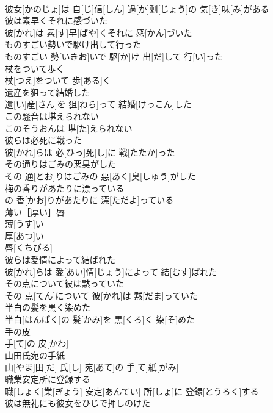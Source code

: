 \documentclass[8pt]{extreport}
\begin{document}
\begin{CJK}{UTF8}{min}
\\	彼女[かのじょ]は 自[じ]信[しん] 過[か]剰[じょう]の 気[き]味[み]がある
\\	彼は素早くそれに感づいた	
\\	彼[かれ]は 素[す]早[ばや]くそれに 感[かん]づいた
\\	ものすごい勢いで駆け出して行った	
\\	ものすごい 勢[いきお]いで 駆[か]け 出[だ]して 行[い]った
\\	杖をついて歩く	
\\	杖[つえ]をついて 歩[ある]く
\\	遺産を狙って結婚した	
\\	遺[い]産[さん]を 狙[ねら]って 結婚[けっこん]した
\\	この騒音は堪えられない	
\\	このそうおんは 堪[た]えられない
\\	彼らは必死に戦った	
\\	彼[かれ]らは 必[ひっ]死[し]に 戦[たたか]った
\\	その通りはごみの悪臭がした	
\\	その 通[とお]りはごみの 悪[あく]臭[しゅう]がした
\\	梅の香りがあたりに漂っている	
\\	[｟文語｠
\\	梅[うめ]の 香[かお]りがあたりに 漂[ただよ]っている
\\	薄い［厚い］唇	
\\	薄[うす]い 
\\	厚[あつ]い 
\\	唇[くちびる]
\\	彼らは愛情によって結ばれた	
\\	彼[かれ]らは 愛[あい]情[じょう]によって 結[むす]ばれた
\\	その点について彼は黙っていた	
\\	その 点[てん]について 彼[かれ]は 黙[だま]っていた
\\	半白の髪を黒く染めた	
\\	半白[はんぱく]の 髪[かみ]を 黒[くろ]く 染[そ]めた
\\	手の皮	
\\	手[て]の 皮[かわ]
\\	山田氏宛の手紙	
\\	山[やま]田[だ] 氏[し] 宛[あて]の 手[て]紙[がみ]
\\	職業安定所に登録する	
\\	職[しょく]業[ぎょう] 安定[あんてい] 所[しょ]に 登録[とうろく]する
\\	彼は無礼にも彼女をひじで押しのけた	

\end{CJK}
\end{document}
